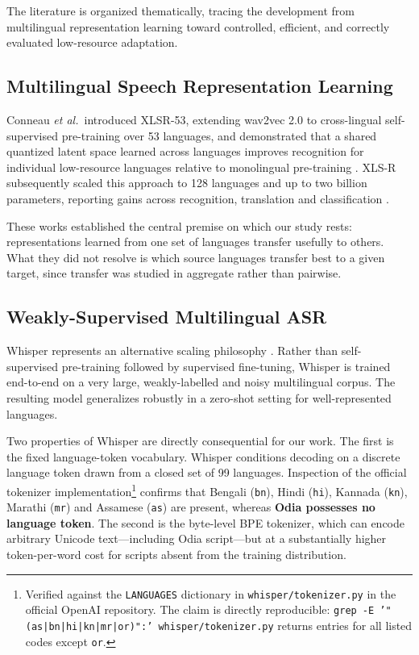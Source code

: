 \documentclass[conference]{IEEEtran}
\begin{document}
The literature is organized thematically, tracing the development from
multilingual representation learning toward controlled, efficient, and
correctly evaluated low-resource adaptation.

\subsection{Multilingual Speech Representation Learning}

Conneau \emph{et al.}\ introduced XLSR-53, extending wav2vec 2.0 to
cross-lingual self-supervised pre-training over 53 languages, and
demonstrated that a shared quantized latent space learned across
languages improves recognition for individual low-resource languages
relative to monolingual pre-training \cite{conneau2021xlsr}. XLS-R
subsequently scaled this approach to 128 languages and up to two billion
parameters, reporting gains across recognition, translation and
classification \cite{babu2022xlsr}.

These works established the central premise on which our study rests:
representations learned from one set of languages transfer usefully to
others. What they did not resolve is which source languages transfer
best to a given target, since transfer was studied in aggregate rather
than pairwise.

\subsection{Weakly-Supervised Multilingual ASR}

Whisper represents an alternative scaling philosophy \cite{radford2023whisper}.
Rather than self-supervised pre-training followed by supervised
fine-tuning, Whisper is trained end-to-end on a very large,
weakly-labelled and noisy multilingual corpus. The resulting model
generalizes robustly in a zero-shot setting for well-represented
languages.

Two properties of Whisper are directly consequential for our work. The
first is the fixed language-token vocabulary. Whisper conditions
decoding on a discrete language token drawn from a closed set of 99
languages. Inspection of the official tokenizer
implementation\footnote{Verified against the \texttt{LANGUAGES}
dictionary in \texttt{whisper/tokenizer.py} in the official OpenAI
repository. The claim is directly reproducible:
\texttt{grep -E '"(as|bn|hi|kn|mr|or)":' whisper/tokenizer.py} returns
entries for all listed codes except \texttt{or}.} confirms
that Bengali (\texttt{bn}), Hindi (\texttt{hi}), Kannada (\texttt{kn}),
Marathi (\texttt{mr}) and Assamese (\texttt{as}) are present, whereas
\textbf{Odia possesses no language token}. The second is the byte-level
BPE tokenizer, which can encode arbitrary Unicode text---including Odia
script---but at a substantially higher token-per-word cost for scripts
absent from the training distribution.
\end{document}
